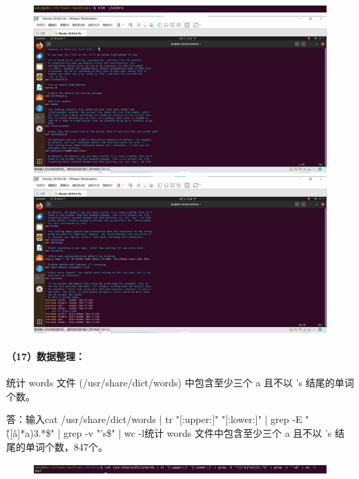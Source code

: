 \documentclass[a4paper, 12pt]{article}
\begin{document}
	\begin{figure}[H]
		\centering
		\includegraphics[width=1\textwidth]{041.jpg}
		\includegraphics[width=1\textwidth]{039.jpg}
		\includegraphics[width=1\textwidth]{040.jpg}
	\end{figure}
	
	\paragraph{（17）数据整理：}
	统计 words 文件 (/usr/share/dict/words) 中包含至少三个 a 且不以 's 结尾的单词个数。
	
	答：输入cat /usr/share/dict/words | tr "[:upper:]" "[:lower:]" | grep -E "\^([\^a]*a){3}.*\$" | grep -v "'s\$" | wc -l统计 words 文件中包含至少三个 a 且不以 's 结尾的单词个数，847个。
	
	\begin{figure}[H]
		\centering
		\includegraphics[width=1\textwidth]{042.jpg}
	\end{figure}
	
\end{document}
